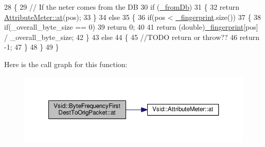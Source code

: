 \begin{DoxyCode}
28 \{
29     \textcolor{comment}{// If the neter comes from the DB}
30     \textcolor{keywordflow}{if} (\hyperlink{class_vsid_1_1_attribute_meter_a2ce3946fc699d3c375ee4019a9e3c022}{\_fromDb})
31     \{
32         \textcolor{keywordflow}{return} \hyperlink{class_vsid_1_1_attribute_meter_a3b067be638ae613a732fa090c07c5e71}{AttributeMeter::at}(pos);
33     \}
34     \textcolor{keywordflow}{else}
35     \{
36         \textcolor{keywordflow}{if}(pos < \hyperlink{class_vsid_1_1_attribute_meter_a0386b2fe9c5d6ab6fba16029d8da4efe}{\_fingerprint}.size())
37         \{
38             \textcolor{keywordflow}{if}(\_overall\_byte\_size == 0)
39                 \textcolor{keywordflow}{return} 0;
40             
41             \textcolor{keywordflow}{return} (\textcolor{keywordtype}{double})\hyperlink{class_vsid_1_1_attribute_meter_a0386b2fe9c5d6ab6fba16029d8da4efe}{\_fingerprint}[pos] / \_overall\_byte\_size;
42         \}
43         \textcolor{keywordflow}{else}
44         \{
45             \textcolor{comment}{//TODO return or throw??}
46             \textcolor{keywordflow}{return} -1;
47         \}
48     \}
49 \}
\end{DoxyCode}


Here is the call graph for this function\-:
\nopagebreak
\begin{figure}[H]
\begin{center}
\leavevmode
\includegraphics[width=350pt]{class_vsid_1_1_byte_frequency_first_dest_to_orig_packet_abf57aa7255bb08e2cc2920154b872232_cgraph}
\end{center}
\end{figure}


